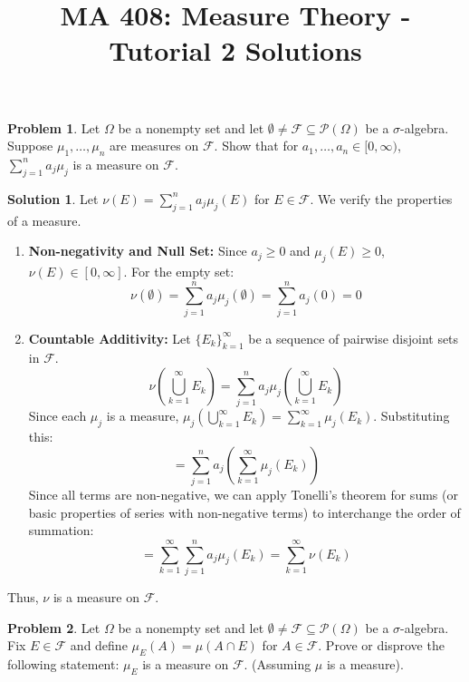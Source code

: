 \documentclass{article}
\title{MA 408: Measure Theory - Tutorial 2 Solutions}
\author{}
\date{}
\theoremstyle{definition}
\newtheorem{problem}{Problem}
\newtheorem*{solution}{Solution}
\begin{document}
\maketitle

\begin{problem}
Let $\Omega$ be a nonempty set and let $\emptyset \neq \mathcal{F} \subseteq \mathcal{P}(\Omega)$ be a $\sigma$-algebra. Suppose $\mu_1, \dots, \mu_n$ are measures on $\mathcal{F}$. Show that for $a_1, \dots, a_n \in [0, \infty)$, $\sum_{j=1}^n a_j \mu_j$ is a measure on $\mathcal{F}$.
\end{problem}

\begin{solution}
Let $\nu(E) = \sum_{j=1}^n a_j \mu_j(E)$ for $E \in \mathcal{F}$. We verify the properties of a measure.

\begin{enumerate}
    \item \textbf{Non-negativity and Null Set:}
    Since $a_j \ge 0$ and $\mu_j(E) \ge 0$, $\nu(E) \in [0, \infty]$.
    For the empty set:
    \[ \nu(\emptyset) = \sum_{j=1}^n a_j \mu_j(\emptyset) = \sum_{j=1}^n a_j (0) = 0 \]
    
    \item \textbf{Countable Additivity:}
    Let $\{E_k\}_{k=1}^\infty$ be a sequence of pairwise disjoint sets in $\mathcal{F}$.
    \[ \nu\left(\bigcup_{k=1}^\infty E_k\right) = \sum_{j=1}^n a_j \mu_j\left(\bigcup_{k=1}^\infty E_k\right) \]
    Since each $\mu_j$ is a measure, $\mu_j(\bigcup_{k=1}^\infty E_k) = \sum_{k=1}^\infty \mu_j(E_k)$. Substituting this:
    \[ = \sum_{j=1}^n a_j \left( \sum_{k=1}^\infty \mu_j(E_k) \right) \]
    Since all terms are non-negative, we can apply Tonelli's theorem for sums (or basic properties of series with non-negative terms) to interchange the order of summation:
    \[ = \sum_{k=1}^\infty \sum_{j=1}^n a_j \mu_j(E_k) = \sum_{k=1}^\infty \nu(E_k) \]
\end{enumerate}
Thus, $\nu$ is a measure on $\mathcal{F}$.
\end{solution}

\hrulefill

\begin{problem}
Let $\Omega$ be a nonempty set and let $\emptyset \neq \mathcal{F} \subseteq \mathcal{P}(\Omega)$ be a $\sigma$-algebra. Fix $E \in \mathcal{F}$ and define $\mu_E(A) = \mu(A \cap E)$ for $A \in \mathcal{F}$. Prove or disprove the following statement: $\mu_E$ is a measure on $\mathcal{F}$. (Assuming $\mu$ is a measure).
\end{problem}
\end{document}
